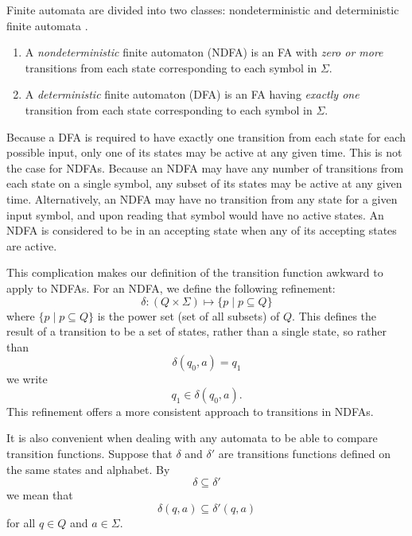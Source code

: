 \documentclass{bcthesis}
\renewcommand{\meo}[1]{}
\newcommand{\footcite}[2]{\xspace\cite[pg.~{#2}]{#1}\xspace}
\begin{document}
		\begin{definition}
			Finite automata are divided into two classes: nondeterministic and deterministic finite automata \footcite{hopcroft}{19}.
			\begin{enumerate}[label=(\roman*)]
				\item A \textit{nondeterministic} finite automaton (NDFA) is an FA with \textit{zero or more} transitions from each state corresponding to each symbol in $\Sigma$.
				\item A \textit{deterministic} finite automaton (DFA) is an FA having \textit{exactly one} transition from each state corresponding to each symbol in $\Sigma$.
			\end{enumerate}
		\end{definition}

		\begin{remark}
			Because a DFA is required to have exactly one transition from each state for each possible input, only one of its states may be active at any given time.
			This is not the case for NDFAs.
			Because an NDFA may have any number of transitions from each state on a single symbol, any subset of its states may be active at any given time.
			Alternatively, an NDFA may have no transition from any state for a given input symbol, and upon reading that symbol would have no active states.
			An NDFA is considered to be in an accepting state when any of its accepting states are active.

			This complication makes our definition of the transition function awkward to apply to NDFAs.
			For an NDFA, we define the following refinement:
			\[
				\delta : (Q \times \Sigma) \mapsto \{ p \mid p \subseteq Q \}
			\]
			where $\{ p \mid p \subseteq Q \}$ is the power set (set of all subsets) of $Q$.
			This defines the result of a transition to be a set of states, rather than a single state, so rather than
			\[
				\delta(q_0, a) = q_1
			\]
			we write
			\[
				q_1 \in \delta(q_0, a).
			\]
			This refinement offers a more consistent approach to transitions in NDFAs.

			It is also convenient when dealing with any automata to be able to compare transition functions.
			Suppose that $\delta$ and $\delta'$ are transitions functions defined on the same states and alphabet.
			By
			\[
				\delta \subseteq \delta'
			\]
			we mean that
			\[
				\delta(q, a) \subseteq \delta'(q, a)
			\]
			for all $q \in Q$ and $a \in \Sigma$.

			\meo{I could mention lambda transitions, but I've avoided using them so far, so I don't think I need to.}

		\end{remark}
\end{document}
